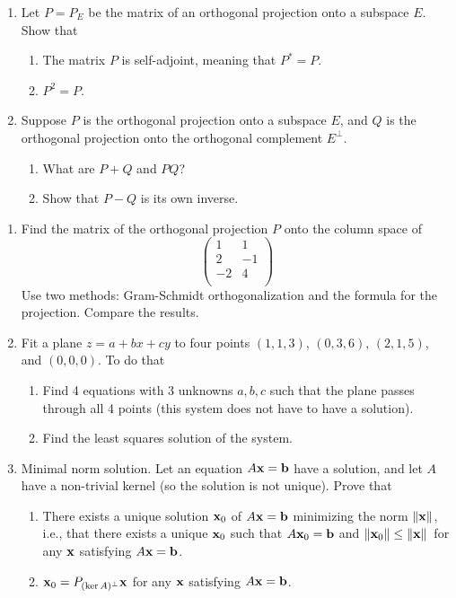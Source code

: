 \documentclass[../psets.tex]{subfiles}
\begin{document}
\begin{enumerate}[label={\textbf{3.\arabic*.}}]
    \item Let $P=P_E$ be the matrix of an orthogonal projection onto a subspace $E$. Show that
    \begin{enumerate}
        \item The matrix $P$ is self-adjoint, meaning that $P^*=P$.
        \item $P^2=P$.
    \end{enumerate}
    \item Suppose $P$ is the orthogonal projection onto a subspace $E$, and $Q$ is the orthogonal projection onto the orthogonal complement $E^\perp$.
    \begin{enumerate}
        \item What are $P+Q$ and $PQ$?
        \item Show that $P-Q$ is its own inverse.
    \end{enumerate}
\end{enumerate}

\begin{enumerate}[label={\textbf{4.\arabic*.}}]
    \item Find the matrix of the orthogonal projection $P$ onto the column space of
    \begin{equation*}
        \begin{pmatrix}
            1 & 1\\
            2 & -1\\
            -2 & 4\\
        \end{pmatrix}
    \end{equation*}
    Use two methods: Gram-Schmidt orthogonalization and the formula for the projection. Compare the results.
    \item Fit a plane $z=a+bx+cy$ to four points $(1,1,3)$, $(0,3,6)$, $(2,1,5)$, and $(0,0,0)$. To do that
    \begin{enumerate}
        \item Find 4 equations with 3 unknowns $a,b,c$ such that the plane passes through all 4 points (this system does not have to have a solution).
        \item Find the least squares solution of the system.
    \end{enumerate}
    \item Minimal norm solution. Let an equation $A\mathbf{x}=\mathbf{b}$ have a solution, and let $A$ have a non-trivial kernel (so the solution is not unique). Prove that
    \begin{enumerate}
        \item There exists a unique solution $\mathbf{x}_0$ of $A\mathbf{x}=\mathbf{b}$ minimizing the norm $\norm{\mathbf{x}}$, i.e., that there exists a unique $\mathbf{x}_0$ such that $A\mathbf{x}_0=\mathbf{b}$ and $\norm{\mathbf{x}_0}\leq\norm*{\mathbf{x}}$ for any $\mathbf{x}$ satisfying $A\mathbf{x}=\mathbf{b}$.
        \item $\mathbf{x}_0=P_{(\ker A)^\perp}\mathbf{x}$ for any $\mathbf{x}$ satisfying $A\mathbf{x}=\mathbf{b}$.
    \end{enumerate}
\end{enumerate}
\end{document}

